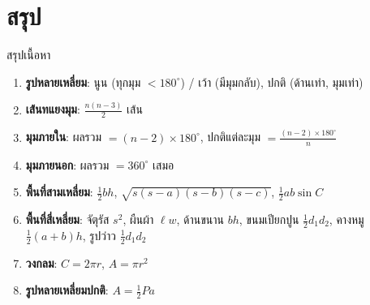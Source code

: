 \documentclass[11pt, aspectratio=169]{beamer}
\begin{document}
\section{สรุป}

\begin{frame}{สรุปเนื้อหา}
  \begin{explanation}[สิ่งที่ได้เรียนรู้]
    \begin{enumerate}
      \item \textbf{รูปหลายเหลี่ยม}: นูน (ทุกมุม $< 180^\circ$) / เว้า (มีมุมกลับ), ปกติ (ด้านเท่า, มุมเท่า)
      \item \textbf{เส้นทแยงมุม}: $\frac{n(n-3)}{2}$ เส้น
      \item \textbf{มุมภายใน}: ผลรวม $= (n-2) \times 180^\circ$,
             ปกติแต่ละมุม $= \frac{(n-2) \times 180^\circ}{n}$
      \item \textbf{มุมภายนอก}: ผลรวม $= 360^\circ$ เสมอ
      \item \textbf{พื้นที่สามเหลี่ยม}: $\frac{1}{2}bh$, $\sqrt{s(s-a)(s-b)(s-c)}$, $\frac{1}{2}ab\sin C$
      \item \textbf{พื้นที่สี่เหลี่ยม}: จัตุรัส $s^2$, ผืนผ้า $\ell w$, ด้านขนาน $bh$,
             ขนมเปียกปูน $\frac{1}{2}d_1d_2$, คางหมู $\frac{1}{2}(a+b)h$, รูปว่าว $\frac{1}{2}d_1d_2$
      \item \textbf{วงกลม}: $C = 2\pi r$, $A = \pi r^2$
      \item \textbf{รูปหลายเหลี่ยมปกติ}: $A = \frac{1}{2}Pa$
    \end{enumerate}
  \end{explanation}
\end{frame}
\end{document}
